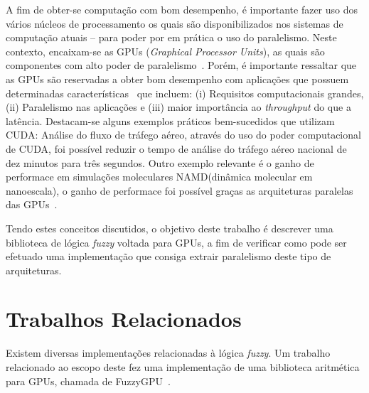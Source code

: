 \documentclass[12pt]{article}
\begin{document}
	A fim de obter-se computação com bom desempenho, é importante fazer uso dos vários núcleos de processamento os quais são disponibilizados nos sistemas de computação atuais -- para poder por em prática o uso do paralelismo. Neste contexto, encaixam-se as GPUs (\textit{Graphical Processor Units}), as quais são componentes com alto poder de paralelismo~\cite{sengupta:07}. Porém, é importante ressaltar que as GPUs são reservadas a obter bom desempenho com aplicações que possuem determinadas características~\cite{owens:08} que incluem: (i) Requisitos computacionais grandes, (ii) Paralelismo nas aplicações e (iii) maior importância ao \textit{throughput} do que a latência. Destacam-se alguns exemplos práticos bem-sucedidos que utilizam CUDA:
Análise do fluxo de tráfego aéreo, através do uso do poder computacional de CUDA, foi possível reduzir o tempo de análise do tráfego aéreo nacional
de dez minutos para três segundos. Outro exemplo relevante é o ganho de performace em simulações moleculares NAMD(dinâmica molecular em nanoescala), o ganho de performace foi possível graças as arquiteturas paralelas das GPUs~\cite{nvidia:15}.


	Tendo estes conceitos discutidos, o objetivo deste trabalho é descrever uma biblioteca de lógica \textit{fuzzy} voltada para GPUs, a fim de verificar como pode ser efetuado uma implementação que consiga extrair paralelismo deste tipo de arquiteturas.
	
\section{Trabalhos Relacionados}

	Existem diversas implementações relacionadas à lógica \textit{fuzzy}. Um trabalho relacionado ao escopo deste fez uma implementação de uma biblioteca aritmética para GPUs, chamada de FuzzyGPU~\cite{defour:14}.
	


\end{document}
